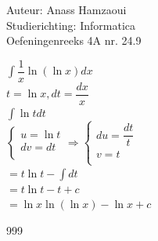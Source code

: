 \documentclass[a4paper]{article}
\begin{document}
  
\noindent \large Auteur: Anass Hamzaoui \\
\noindent \large Studierichting: Informatica \\
\noindent \large Oefeningenreeks 4A nr. 24.9 \\

\medskip

\normalsize

$\displaystyle\int \dfrac{1}{x} \ln (\ln x) dx$ \\

$t = \ln x, dt = \dfrac{dx}{x}$ \\

$\displaystyle\int \ln t dt$ \\

$\left\{
\begin{array}{l}
    u = \ln t \\
    dv = dt \\
\end{array}
\right. 
\Rightarrow
\left\{
\begin{array}{l}
    du = \dfrac{dt}{t} \\
    v = t \\
\end{array}
\right.$ \\

$= t \ln t - \displaystyle\int dt$ \\

$= t \ln t - t + c$ \\

$= \ln x \ln (\ln x) - \ln x + c$ \\

\begin{thebibliography}{999}
\end{thebibliography}
\end{document}
